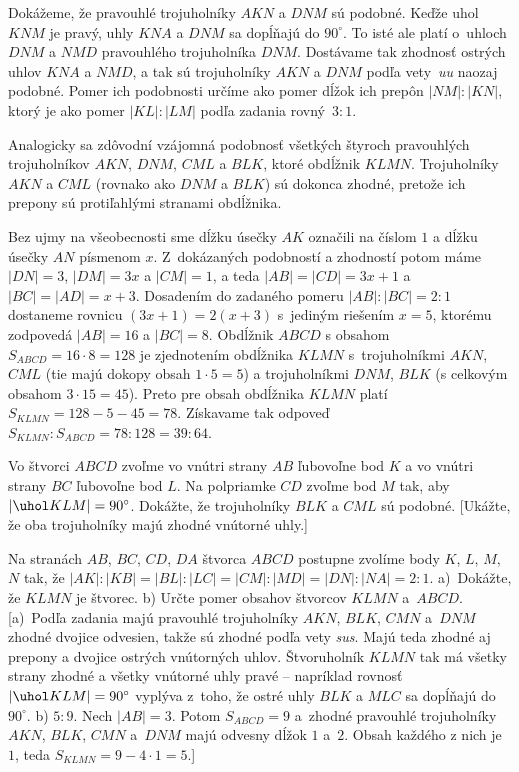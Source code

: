 {%
Dokážeme, že pravouhlé trojuholníky $AKN$ a $DNM$ sú
podobné. Keďže uhol $KNM$ je pravý, uhly $KNA$ a $DNM$
sa dopĺňajú do $90^\circ$. To isté ale platí o~uhloch $DNM$ a $NMD$
pravouhlého trojuholníka $DNM$. Dostávame tak zhodnosť ostrých uhlov
$KNA$ a $NMD$, a tak sú trojuholníky $AKN$ a $DNM$ podľa vety~\emph{uu}
naozaj podobné. Pomer ich podobnosti určíme ako pomer
dĺžok ich prepôn $|NM|:|KN|$, ktorý je ako pomer
$|KL|:|LM|$ podľa zadania rovný~$3:1$.
%

Analogicky sa zdôvodní vzájomná podobnosť všetkých
štyroch pravouhlých trojuholníkov $AKN$, $DNM$, $CML$ a $BLK$, ktoré
 obdĺžnik $KLMN$. Trojuholníky $AKN$ a $CML$
(rovnako ako $DNM$ a $BLK$) sú dokonca zhodné, pretože ich
prepony sú protiľahlými stranami obdĺžnika.

Bez ujmy na všeobecnosti sme dĺžku úsečky $AK$ označili
na \obr{} číslom $1$ a dĺžku úsečky $AN$ písmenom $x$.
Z~dokázaných podobností a zhodností potom máme
$|DN|=3$, $|DM|=3x$ a $|CM|=1$, a teda $|AB|=|CD|=3x+1$ a
$|BC|=|AD|=x+3$. Dosadením do zadaného pomeru $|AB|:|BC|=2:1$
dostaneme rovnicu $(3x+1)=2(x+3)$ s~jediným riešením $x=5$,
ktorému zodpovedá $|AB|=16$ a $|BC|=8$. Obdĺžnik $ABCD$
s obsahom $S_{ABCD}=16\cdot8=128$ je zjednotením obdĺžnika $KLMN$
s~trojuholníkmi $AKN$, $CML$ (tie majú dokopy obsah $1\cdot5=5$) a trojuholníkmi
$DNM$, $BLK$ (s celkovým obsahom $3\cdot15=45$). Preto
pre obsah obdĺžnika $KLMN$ platí
$S_{KLMN}=128-5-45=78$.
Získavame tak odpoveď $S_{KLMN}:S_{ABCD}=78:128=39:64$.


Vo štvorci $ABCD$ zvoľme vo vnútri strany $AB$ ľubovoľne
bod $K$ a vo vnútri strany $BC$ ľubovoľne bod $L$. Na polpriamke
$CD$ zvoľme bod $M$ tak, aby $|\uhol KLM|=90^\circ$. Dokážte, že
trojuholníky $BLK$ a $CML$ sú podobné.
[Ukážte, že oba trojuholníky majú zhodné vnútorné uhly.]

Na stranách $AB$, $BC$, $CD$, $DA$ štvorca $ABCD$
postupne zvolíme body $K$, $L$, $M$, $N$ tak, že
$|AK|:|KB|=|BL|:|LC|=|CM|:|MD|=|DN|:|NA|=2:1$.
a)~Dokážte, že $KLMN$ je štvorec.
b) Určte pomer obsahov štvorcov $KLMN$ a~$ABCD$.
[a)~Podľa zadania majú pravouhlé trojuholníky $AKN$, $BLK$, $CMN$ a~$DNM$
zhodné dvojice odvesien, takže sú zhodné podľa vety {\it sus}.
Majú teda zhodné aj prepony a dvojice ostrých vnútorných uhlov.
Štvoruholník $KLMN$ tak má všetky strany zhodné a všetky vnútorné uhly
pravé -- napríklad rovnosť $|\uhol KLM|=90^{\circ}$ vyplýva z~toho, že
ostré uhly $BLK$ a $MLC$ sa dopĺňajú do~$90^{\circ}$.
b) $5:9$. Nech $|AB|=3$. Potom $S_{ABCD}=9$ a~zhodné pravouhlé
trojuholníky $AKN$, $BLK$, $CMN$ a~$DNM$ majú odvesny dĺžok $1$ a~$2$.
Obsah každého z nich je $1$, teda $S_{KLMN}=9-4\cdot1=5$.]

}
